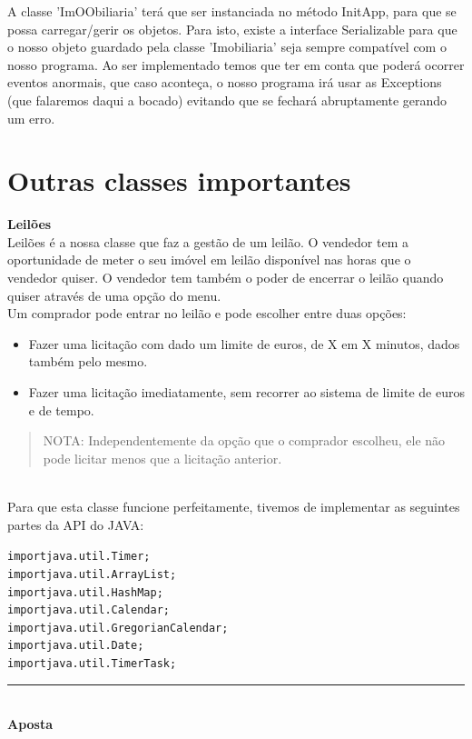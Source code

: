 \documentclass[12pt]{article}
\newenvironment{code}                    
{\textbf{
} \hspace{1cm} \hrulefill \\ 
\smallskip 
\begin{center}
\begin{minipage}{0.9\textwidth} 
\begin{alltt}\small}
{\end{alltt}
\end{minipage}
\end{center}
\hrule\smallskip
}
\begin{document}
A classe 'ImOObiliaria' terá que ser instanciada no método
InitApp, para que se possa carregar/gerir os objetos.
Para isto, existe a interface Serializable para que o nosso objeto guardado pela classe 'Imobiliaria'
seja sempre compatível com o nosso programa. Ao ser implementado temos que ter em conta
que poderá ocorrer eventos anormais, que caso aconteça, o nosso programa irá usar as Exceptions (que falaremos daqui a bocado)
evitando que se fechará abruptamente gerando um erro. 
~\\

\pagebreak
\section{Outras classes importantes}

\textbf{Leilões}
\newline
~\\

Leilões é a nossa classe que faz a gestão de um leilão. O vendedor tem a oportunidade de meter o seu imóvel em leilão disponível nas horas que o vendedor quiser. O vendedor tem também o poder de encerrar o leilão quando quiser através de uma opção do menu.
~\\

Um comprador pode entrar no leilão e pode escolher entre duas opções:
\begin{itemize}
\item Fazer uma licitação com dado um limite de euros, de X em X minutos, dados também pelo mesmo. 
\item Fazer uma licitação imediatamente, sem recorrer ao sistema de limite de euros e de tempo.
\end{itemize}
\begin{quote}
NOTA: Independentemente da opção que o comprador escolheu, ele não pode licitar menos que a licitação anterior.
\end{quote}
~\\

Para que esta classe funcione perfeitamente, tivemos de implementar as seguintes partes da API do JAVA:
\newline
\begin{code}
import java.util.Timer;
import java.util.ArrayList;
import java.util.HashMap;
import java.util.Calendar;
import java.util.GregorianCalendar;
import java.util.Date;
import java.util.TimerTask;
\end{code}
~\\
\textbf{Aposta}
\newline
~\\
\end{document}
